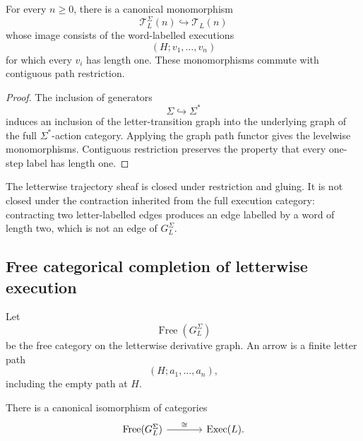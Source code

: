 \begin{proposition}
\label{prop:letterwise-derivative-trajectories}
For every \(n\geq0\), there is a canonical monomorphism
\[
    \mathscr T_L^\Sigma(n)
    \hookrightarrow
    \mathscr T_L(n)
\]
whose image consists of the word-labelled executions
\[
    (H;v_1,\ldots,v_n)
\]
for which every \(v_i\) has length one. These monomorphisms commute with
contiguous path restriction.
\end{proposition}

\begin{proof}
The inclusion of generators
\[
    \Sigma\hookrightarrow\Sigma^\ast
\]
induces an inclusion of the letter-transition graph into the underlying graph
of the full \(\Sigma^\ast\)-action category. Applying the graph path functor
gives the levelwise monomorphisms. Contiguous restriction preserves the
property that every one-step label has length one.
\end{proof}

The letterwise trajectory sheaf is closed under restriction and gluing. It is
not closed under the contraction inherited from the full execution category:
contracting two letter-labelled edges produces an edge labelled by a word of
length two, which is not an edge of \(G_L^\Sigma\).

\subsection{Free categorical completion of letterwise execution}
\label{subsec:letterwise-free-category-completion}

Let
\[
    \operatorname{Free}(G_L^\Sigma)
\]
be the free category on the letterwise derivative graph. An arrow is a finite
letter path
\[
    (H;a_1,\ldots,a_n),
\]
including the empty path at \(H\).

\begin{theorem}
\label{thm:letterwise-free-category-completion}
There is a canonical isomorphism of categories
\[
\begin{tikzcd}[column sep=large]
    \operatorname{Free}(G_L^\Sigma)
        \arrow[r, "\cong"]
    &
    \operatorname{Exec}(L).
\end{tikzcd}
\]
\end{theorem}

